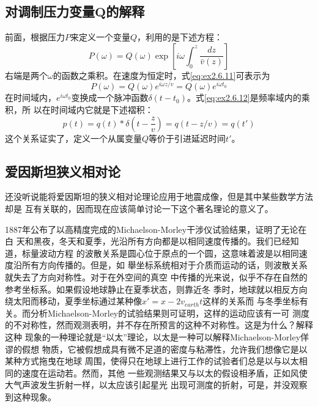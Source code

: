 \subsection{对调制压力变量$\mathbf{Q}$的解释}
\label{sec:2.6.5}
前面，根据压力$P$来定义一个变量$Q$，利用的是下述方程：
\begin{equation}
P(\omega)=Q(\omega)\exp[i\omega\int_0^z\frac{dz}{\bar{v}(z)}]
\label{eq:ex2.6.11}
\end{equation}
右端是两个$\omega$的函数之乘积。在速度为恒定时，式\ref{eq:ex2.6.11}可表示为
\begin{equation}
P(\omega)=Q(\omega)e^{i\omega z/v}=Q(\omega)e^{i\omega t_0}
\label{eq:ex2.6.12}
\end{equation}
在时间域内，$e^{i\omega t_0}$变换成一个脉冲函数$\delta(t-t_0)$。式\ref{eq:ex2.6.12}是频率域内的乘积，所
以在时间域内它就是下述褶积：
\begin{equation}
p(t)=q(t)*\delta(t-\frac{z}{v})=q(t-z/v)=q(t')
\label{eq:ex2.6.13}
\end{equation}
这个关系证实了，定义一个从属变量$Q$等价于引进延迟时间$t'$。

\subsection{爱因斯坦狭义相对论}
\label{sec:2.6.6}

还没听说能将爱因斯坦的狭义相对论理论应用于地震成像，但是其中某些数学方法却是
互有关联的，因而现在应该简单讨论一下这个著名理论的意义了。

1887年公布了以高精度完成的Michaelson-Morley干涉仪试验结果，证明了无论在白
天和黑夜，冬天和夏季，光沿所有方向都是以相同速度传播的。我们已经知道，标量波动方程
的波散关系是圆心位于原点的一个圆，这意味着波是以相同速度沿所有方向传播的。但是，如
舉坐标系统相对于介质而运动的话，则波散关系就失去了方向对称性。对于在外空间的真空
中传播的光来说，似乎不存在自然的参考坐标系。如果假设地球静止在夏季状态，则靠近冬
季时，地球就以相反方向绕太阳而移动，夏季坐标通过某种像$x'=x-2v_{earth}t$这样的关系而
与冬季坐标有关。而分析Michaelson-Morley的试验结果则可证明，这样的运动应该有一可
测度的不对称性，然而观测表明，并不存在所预言的这种不对称性。这是为什么？解释这种
现象的一种理论就是“以太”理论，以太是一种可以解释Michaelson-Morley佯谬的假想
物质，它被假想成具有微不足道的密度与粘滞性，允许我们想像它是以某种方式拖曳在地球
周围，使得只在地球上进行工作的试验者们总是以与以太相同的速度在运动若。然而，其他
一些观测结果又与以太的假设相矛盾，正如风使大气声波发生折射一样，以太应该引起星光
出现可测度的折射，可是，并没观察到这种现象。

